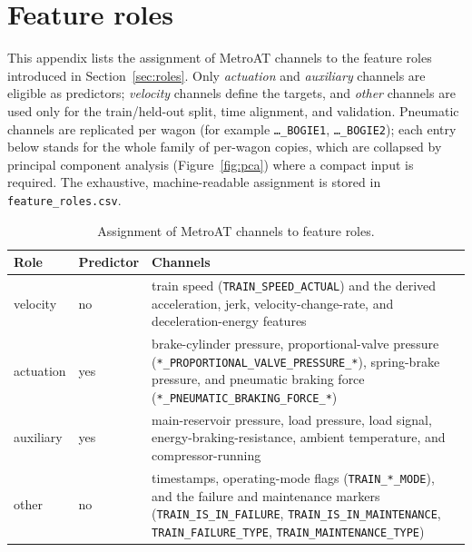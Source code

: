 \chapter{Feature roles}
\label{app:roles}

This appendix lists the assignment of MetroAT channels to the feature roles introduced in
Section~\ref{sec:roles}. Only \emph{actuation} and \emph{auxiliary} channels are eligible as
predictors; \emph{velocity} channels define the targets, and \emph{other} channels are used
only for the train/held-out split, time alignment, and validation. Pneumatic channels are
replicated per wagon (for example \texttt{\ldots\_BOGIE1}, \texttt{\ldots\_BOGIE2}); each entry
below stands for the whole family of per-wagon copies, which are collapsed by principal
component analysis (Figure~\ref{fig:pca}) where a compact input is required. The exhaustive,
machine-readable assignment is stored in \texttt{feature\_roles.csv}.

\begin{table}[htbp]
  \centering
  \caption{Assignment of MetroAT channels to feature roles.}
  \label{tab:approles}
  \begin{tabularx}{\linewidth}{l l >{\RaggedRight}X}
    \toprule
    Role & Predictor & Channels \\
    \midrule
    velocity  & no  & train speed (\texttt{TRAIN\_SPEED\_ACTUAL}) and the derived acceleration,
                      jerk, velocity-change-rate, and deceleration-energy features \\[1ex]
    actuation & yes & brake-cylinder pressure, proportional-valve pressure
                      (\texttt{*\_PROPORTIONAL\_VALVE\_PRESSURE\_*}), spring-brake pressure, and
                      pneumatic braking force (\texttt{*\_PNEUMATIC\_BRAKING\_FORCE\_*}) \\[1ex]
    auxiliary & yes & main-reservoir pressure, load pressure, load signal,
                      energy-braking-resistance, ambient temperature, and compressor-running \\[1ex]
    other     & no  & timestamps, operating-mode flags (\texttt{TRAIN\_*\_MODE}), and the
                      failure and maintenance markers (\texttt{TRAIN\_IS\_IN\_FAILURE},
                      \texttt{TRAIN\_IS\_IN\_MAINTENANCE}, \texttt{TRAIN\_FAILURE\_TYPE},
                      \texttt{TRAIN\_MAINTENANCE\_TYPE}) \\
    \bottomrule
  \end{tabularx}
\end{table}

